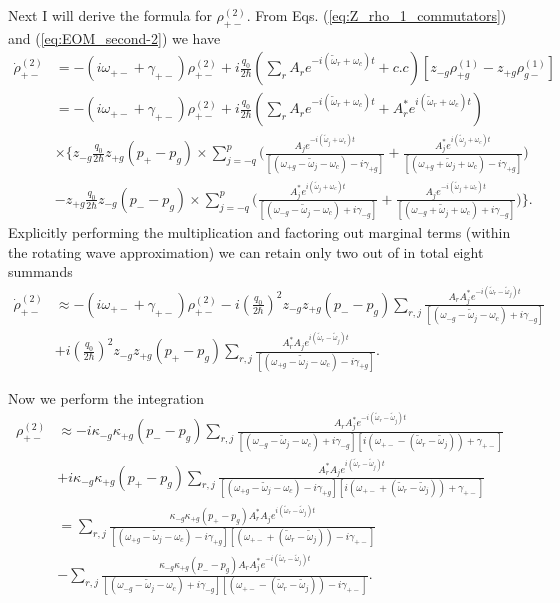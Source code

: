 \documentclass[preprint,secnumarabic,amssymb, nobibnotes, aip, prd]{revtex4-1}
\def\tw{\tilde{\omega}}
\def\tw{\tilde{\omega}}
\begin{document}
	Next I will derive the formula for $\rho_{+-}^{(2)}$. From Eqs. (\ref{eq:Z_rho_1_commutators}) and (\ref{eq:EOM_second-2}) we have
	\begin{align}
	\label{eq:rho_2_pm1}
	\dot{\rho}_{+-}^{(2)} &= -(i\omega_{+-}+\gamma_{+-})\rho_{+-}^{(2)}  + i \frac{q_0}{2\hbar}(\sum_{r}A_r e^{-i(\tilde{\omega}_r+\omega_c)t} + c.c) [z_{-g}\rho_{+g}^{(1)} - z_{+g}\rho_{g-}^{(1)}] \nonumber \\ 
	&= -(i\omega_{+-}+\gamma_{+-})\rho_{+-}^{(2)} + i \frac{q_0}{2\hbar}(\sum_{r}A_r e^{-i(\tilde{\omega}_r+\omega_c)t} + A_r^* e^{i(\tilde{\omega}_r+\omega_c)t} ) \nonumber  \\
	&\times 
	\Big \{
	z_{-g} \frac{q_0}{2\hbar}z_{+ g}(p_+-p_g)\times \sum_{j=-q}^{p} \Big (\frac{A_j e^{-i(\tw_j+\omega_c)t}}{[( \omega_{+ g} - \tw_j-\omega_c) -i\gamma_{+ g}]} 
	+\frac{A_j^* e^{i(\tw_j+\omega_c)t}}{[( \omega_{+ g} + \tw_j+\omega_c) -i\gamma_{+ g}]} \Big) \nonumber \\
	&-z_{+g}
	\frac{q_0}{2\hbar}z_{-g}(p_--p_g)\times \sum_{j=-q}^{p} \Big (\frac{A_j^* e^{i(\tw_j+\omega_c)t}}{[( \omega_{- g} - \tw_j-\omega_c) +i\gamma_{-g}]} 
	+\frac{A_j e^{-i(\tw_j+\omega_c)t}}{[( \omega_{- g} + \tw_j+\omega_c) +i\gamma_{- g}]} \Big)
	\Big \}.
	\end{align}
	Explicitly performing the multiplication and factoring out marginal terms (within the rotating wave approximation) we can retain only two out of in total eight summands 
	\begin{align}
	\label{eq:rho_2_pm2}
	\dot{\rho}_{+-}^{(2)} &\approx -(i\omega_{+-}+\gamma_{+-})\rho_{+-}^{(2)}  - i (\frac{q_0}{2\hbar})^2z_{-g}z_{+g}(p_--p_g)\sum_{r,j}\frac{A_rA_j^* e^{-i(\tw_r-\tw_j)t}}{[( \omega_{- g} - \tw_j-\omega_c) +i\gamma_{- g}]} \nonumber \\
	&+ i (\frac{q_0}{2\hbar})^2z_{-g}z_{+g}(p_+-p_g)\sum_{r,j}\frac{A_r^*A_j e^{i(\tw_r-\tw_j)t}}{[( \omega_{+ g} - \tw_j-\omega_c) -i\gamma_{+ g}]}.
	\end{align}
	
	Now we perform the integration 
	\begin{align}
	\label{eq:rho_2_pm_solution}
	\rho_{+-}^{(2)} &\approx  - i\kappa_{-g}\kappa_{+g}(p_--p_g)\sum_{r,j}\frac{A_rA_j^* e^{-i(\tw_r-\tw_j)t}}{[( \omega_{- g} - \tw_j-\omega_c) +i\gamma_{- g}][i( \omega_{+-} - (\tw_r-\tw_j))+\gamma_{+-}]} \nonumber \\
	&+ i \kappa_{-g}\kappa_{+g}(p_+-p_g)\sum_{r,j}\frac{A_r^*A_j e^{i(\tw_r-\tw_j)t}}{[( \omega_{+ g} - \tw_j-\omega_c) -i\gamma_{+ g}][i( \omega_{+-} + (\tw_r-\tw_j))+\gamma_{+-}]} \nonumber \\
	&= \sum_{r,j}\frac{\kappa_{-g}\kappa_{+g}(p_+-p_g)A_r^*A_j e^{i(\tw_r-\tw_j)t}}{[( \omega_{+ g} - \tw_j-\omega_c) -i\gamma_{+ g}][( \omega_{+-} + (\tw_r-\tw_j))-i\gamma_{+-}]} \nonumber \\
	&-\sum_{r,j}\frac{\kappa_{-g}\kappa_{+g}(p_--p_g)A_rA_j^* e^{-i(\tw_r-\tw_j)t}}{[( \omega_{- g} - \tw_j-\omega_c) +i\gamma_{- g}][(\omega_{+-} - (\tw_r-\tw_j))-i\gamma_{+-}]}.
	\end{align}
	
\end{document}
